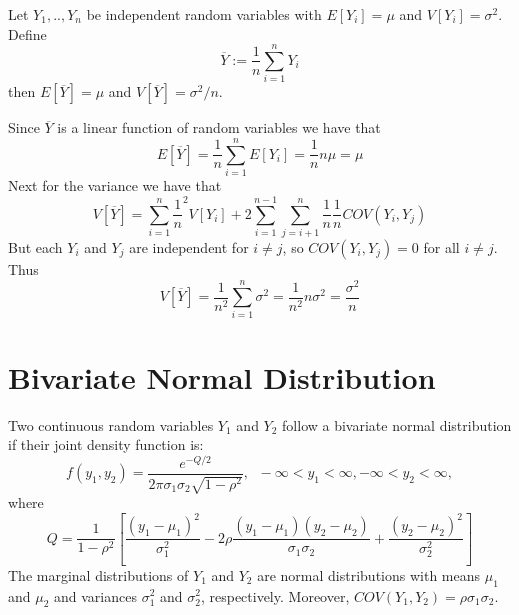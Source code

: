 \documentclass[12pt, a4paper, twoside, openright, titlepage]{book}
\begin{document}
\begin{claim}{}{}
    Let $Y_1,..,Y_n$ be independent random variables with $E[Y_i] = \mu$ and $V[Y_i] = \sigma^2$. Define \begin{equation*}
        \overline{Y} := \frac{1}{n}\sum\limits_{i=1}^nY_i
    \end{equation*}
    then $E[\overline{Y}] = \mu$ and $V[\overline{Y}] = \sigma^2/n$.
\end{claim}
\begin{proof*}{}{}
    Since $\overline{Y}$ is a linear function of random variables we have that \begin{equation*}
        E[\overline{Y}] = \frac{1}{n}\sum\limits_{i=1}^nE[Y_i] = \frac{1}{n}n\mu = \mu
    \end{equation*}
    Next for the variance we have that \begin{equation*}
        V[\overline{Y}] = \sum\limits_{i=1}^n\frac{1}{n}^2V[Y_i] + 2\sum\limits_{i=1}^{n-1}\sum\limits_{j=i+1}^n\frac{1}{n}\frac{1}{n}COV(Y_i,Y_j)
    \end{equation*}
    But each $Y_i$ and $Y_j$ are independent for $i\neq j$, so $COV(Y_i,Y_j) = 0$ for all $ i \neq j$. Thus \begin{equation*}
        V[\overline{Y}] = \frac{1}{n^2}\sum\limits_{i=1}^n\sigma^2 = \frac{1}{n^2}n\sigma^2 = \frac{\sigma^2}{n}
    \end{equation*}
\end{proof*}


\section{\textsection Bivariate Normal Distribution}

\begin{defn}{}{}
    Two continuous random variables $Y_1$ and $Y_2$ follow a bivariate normal distribution if their joint density function is: \begin{equation*}
        f(y_1,y_2) = \frac{e^{-Q/2}}{2\pi\sigma_1\sigma_2\sqrt{1-\rho^2}},\;\;-\infty < y_1 < \infty, -\infty < y_2 < \infty,
    \end{equation*}
    where \begin{equation*}
        Q = \frac{1}{1-\rho^2}\left[\frac{(y_1-\mu_1)^2}{\sigma_1^2} - 2\rho\frac{(y_1-\mu_1)(y_2-\mu_2)}{\sigma_1\sigma_2} + \frac{(y_2-\mu_2)^2}{\sigma_2^2}\right]
    \end{equation*}
    The marginal distributions of $Y_1$ and $Y_2$ are normal distributions with means $\mu_1$ and $\mu_2$ and variances $\sigma_1^2$ and $\sigma_2^2$, respectively. Moreover, $COV(Y_1,Y_2) = \rho\sigma_1\sigma_2$.
\end{defn}
\end{document}

